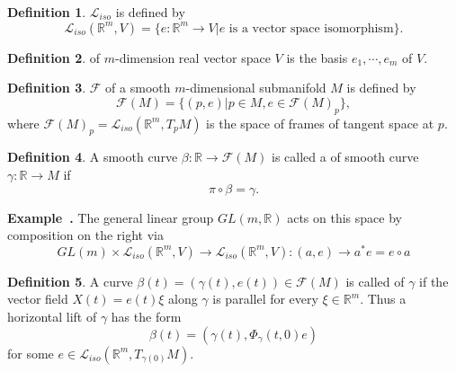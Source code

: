 \documentclass[a4paper]{article}
\theoremstyle{definition}
\newtheorem{definition}{Definition}
\theoremstyle{plain}
\newenvironment{example}[1][]{\refstepcounter{example}\par\medskip
   \noindent \textbf{Example~\theexample. #1} \rmfamily}{\medskip}
\newcounter{example}{Example}
\begin{document}
\begin{definition}
 $\mathcal{L}_{iso}$ is defined by
\begin{equation*}
    \mathcal{L}_{iso}(\mathbb{R}^m,V)=\{e:\mathbb{R}^m\rightarrow V|e \text{ is a vector space isomorphism}\}.
\end{equation*}
\end{definition}

\begin{definition}
 of $m$-dimension real vector space $V$ is the basis $e_1,\cdots,e_m$ of $V$.
\end{definition}

\begin{definition}
 $\mathcal{F}$ of a smooth $m$-dimensional submanifold $M$ is defined by
\begin{equation*}
    \mathcal{F}(M)=\{(p,e)|p\in M,e\in\mathcal{F}(M)_p\},
\end{equation*}
where $\mathcal{F}(M)_p=\mathcal{L}_{iso}(\mathbb{R}^m,T_pM)$ is the space of frames of tangent space at $p$.
\end{definition}

\begin{definition}
A smooth curve $\beta:\mathbb{R}\rightarrow\mathcal{F}(M)$ is called a  of smooth curve $\gamma:\mathbb{R}\rightarrow M$ if \cite{robbin}
\begin{equation*}
    \pi\circ\beta=\gamma.
\end{equation*}
\end{definition}

\begin{example}
The general linear group $GL(m,\mathbb{R})$ acts on this space by composition on the right via
\begin{equation*}
    GL(m)\times\mathcal{L}_{iso}(\mathbb{R}^m,V)\rightarrow\mathcal{L}_{iso}(\mathbb{R}^m,V):(a,e)\rightarrow a^*e=e\circ a
\end{equation*}
\end{example}

\begin{definition}
A curve $\beta(t)=(\gamma(t),e(t))\in\mathcal{F}(M)$ is called  of $\gamma$ if the vector field $X(t)=e(t)\xi$ along $\gamma$ is parallel for every $\xi\in\mathbb{R}^m$. Thus a horizontal lift of $\gamma$ has the form
\begin{equation*}
    \beta(t)=(\gamma(t),\Phi_\gamma(t,0)e)
\end{equation*}
for some $e\in\mathcal{L}_{iso}(\mathbb{R}^m,T_{\gamma(0)}M)$.
\end{definition}
\end{document}
